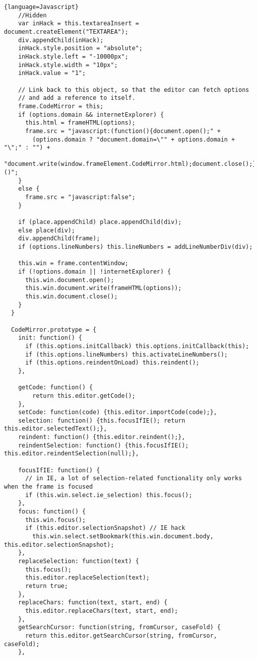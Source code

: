 \begin{lstlisting}{language=Javascript}
    //Hidden
    var inHack = this.textareaInsert = document.createElement("TEXTAREA");
    div.appendChild(inHack);
    inHack.style.position = "absolute";
    inHack.style.left = "-10000px";
    inHack.style.width = "10px";
    inHack.value = "1";
    
    // Link back to this object, so that the editor can fetch options
    // and add a reference to itself.
    frame.CodeMirror = this;
    if (options.domain && internetExplorer) {
      this.html = frameHTML(options);
      frame.src = "javascript:(function(){document.open();" +
        (options.domain ? "document.domain=\"" + options.domain + "\";" : "") +
        "document.write(window.frameElement.CodeMirror.html);document.close();})()";
    }
    else {
      frame.src = "javascript:false";
    }

    if (place.appendChild) place.appendChild(div);
    else place(div);
    div.appendChild(frame);
    if (options.lineNumbers) this.lineNumbers = addLineNumberDiv(div);

    this.win = frame.contentWindow;
    if (!options.domain || !internetExplorer) {
      this.win.document.open();
      this.win.document.write(frameHTML(options));
      this.win.document.close();
    }
  }

  CodeMirror.prototype = {
    init: function() {
      if (this.options.initCallback) this.options.initCallback(this);
      if (this.options.lineNumbers) this.activateLineNumbers();
      if (this.options.reindentOnLoad) this.reindent();
    },

    getCode: function() {
    	return this.editor.getCode();
    },
    setCode: function(code) {this.editor.importCode(code);},
    selection: function() {this.focusIfIE(); return this.editor.selectedText();},
    reindent: function() {this.editor.reindent();},
    reindentSelection: function() {this.focusIfIE(); this.editor.reindentSelection(null);},

    focusIfIE: function() {
      // in IE, a lot of selection-related functionality only works when the frame is focused
      if (this.win.select.ie_selection) this.focus();
    },
    focus: function() {
      this.win.focus();
      if (this.editor.selectionSnapshot) // IE hack
        this.win.select.setBookmark(this.win.document.body, this.editor.selectionSnapshot);
    },
    replaceSelection: function(text) {
      this.focus();
      this.editor.replaceSelection(text);
      return true;
    },
    replaceChars: function(text, start, end) {
      this.editor.replaceChars(text, start, end);
    },
    getSearchCursor: function(string, fromCursor, caseFold) {
      return this.editor.getSearchCursor(string, fromCursor, caseFold);
    },


\end{lstlisting}

